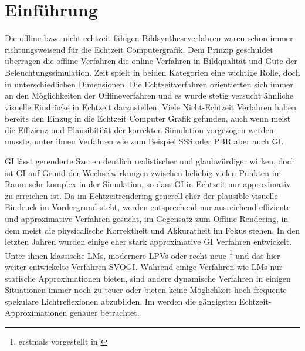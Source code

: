 \chapter{Einführung}

Die offline bzw. nicht echtzeit fähigen Bildsyntheseverfahren waren schon immer richtungsweisend für die Echtzeit Computergrafik. Dem Prinzip geschuldet überragen die offline Verfahren die online Verfahren in Bildqualität und Güte der Beleuchtungssimulation. Zeit spielt in beiden Kategorien eine wichtige Rolle, doch in unterschiedlichen Dimensionen. Die Echtzeitverfahren orientierten sich immer an den Möglichkeiten der Offlineverfahren und es wurde stetig versucht ähnliche visuelle Eindrücke in Echtzeit darzustellen. Viele Nicht-Echtzeit Verfahren haben bereits den Einzug in die Echtzeit Computer Grafik gefunden, auch wenn meist die Effizienz und Plausibitilät der korrekten Simulation vorgezogen werden musste, unter ihnen Verfahren wie zum Beispiel \acf{SSS} \cite{} oder \acf{PBR} \cite{} aber auch \acf{GI}.

\acf{GI} lässt gerenderte Szenen deutlich realistischer und glaubwürdiger wirken, doch ist \ac{GI} auf Grund der Wechselwirkungen zwischen beliebig vielen Punkten im Raum sehr komplex in der Simulation, so dass \ac{GI} in Echtzeit nur approximativ zu erreichen ist. Da im Echtzeitrendering generell eher der plausible visuelle Eindruck im Vordergrund steht, werden entsprechend nur ausreichend effiziente und approximative Verfahren gesucht, im Gegensatz zum Offline Rendering, in dem meist die physicalische Korrektheit und Akkuratheit im Fokus stehen. In den letzten Jahren wurden einige eher stark approximative \ac{GI} Verfahren entwickelt. Unter ihnen klassische \acf{LM}s, modernere \acf{LPV}s oder recht neue \footnote{erstmals vorgestellt in \cite{crassin2011interactive}} und das hier weiter entwickelte Verfahren \acf{SVOGI}. Während einige Verfahren wie \ac{LM}s nur statische Approximationen bieten, sind andere dynamische Verfahren in einigen Situationen immer noch zu teuer oder bieten keine Möglichkeit hoch frequente spekulare Lichtreflexionen abzubilden. Im  werden die gängigsten Echtzeit-Approximationen genauer betrachtet.
